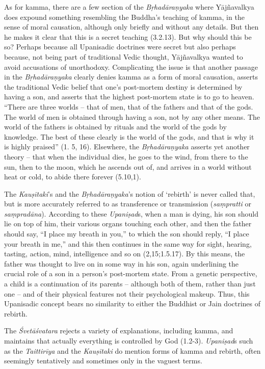As for kamma, there are a few section of the \emph{Bṛhadāraṇyaka} where
Yājñavalkya does expound something resembling the Buddha's teaching of
kamma, in the sense of moral causation, although only briefly and
without any details. But then he makes it clear that this is a secret
teaching (3.2.13). But why should this be so? Perhaps because all
Upanisadic doctrines were secret but also perhaps because, not being
part of traditional Vedic thought, Yājñavalkya wanted to avoid
accusations of unorthodoxy. Complicating the issue is that another
passage in the \emph{Bṛhadāraṇyaka} clearly denies kamma as a form of
moral causation, asserts the traditional Vedic belief that one's
post-mortem destiny is determined by having a son, and asserts that the
highest post-mortem state is to go to heaven. ``There are three worlds
-- that of men, that of the fathers and that of the gods. The world of
men is obtained through having a son, not by any other means. The world
of the fathers is obtained by rituals and the world of the gods by
knowledge. The best of these clearly is the world of the gods, and that
is why it is highly praised'' (1. 5, 16). Elsewhere, the
\emph{Bṛhadāraṇyaka} asserts yet another theory -- that when the
individual dies, he goes to the wind, from there to the sun, then to the
moon, which he ascends out of, and arrives in a world without heat or
cold, to abide there forever (5.10,1).

The \emph{Kauṣītaki}'s and the \emph{Bṛhadāraṇyaka}'s notion of
`rebirth' is never called that, but is more accurately referred to as
transference or transmission (\emph{saṃpratti} or \emph{saṃpradāna}).
According to these \emph{Upaniṣad}s, when a man is dying, his son should
lie on top of him, their various organs touching each other, and then
the father should say, ``I place my breath in you,'' to which the son
should reply, ``I place your breath in me,'' and this then continues in
the same way for sight, hearing, tasting, action, mind, intelligence and
so on (2,15;1.5.17). By this means, the father was thought to live on in
some way in his son, again underlining the crucial role of a son in a
person's post-mortem state. From a genetic perspective, a child is a
continuation of its parents -- although both of them, rather than just
one -- and of their physical features not their psychological makeup.
Thus, this Upanisadic concept bears no similarity to either the Buddhist
or Jain doctrines of rebirth.

The \emph{Śvetāśvatara} rejects a variety of explanations, including
kamma, and maintains that actually everything is controlled by God
(1.2-3). \emph{Upaniṣad}s such as the \emph{Taittirīya} and the
\emph{Kauṣītaki} do mention forms of kamma and rebirth, often seemingly
tentatively and sometimes only in the vaguest terms.

